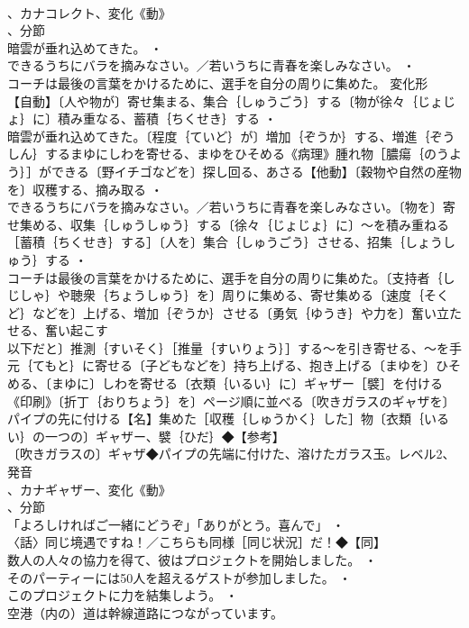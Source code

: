 \documentclass[8pt]{extreport}
\begin{document}
\begin{CJK}{UTF8}{min}
\\	、カナコレクト、変化《動》
\\	、分節
\\	暗雲が垂れ込めてきた。 ・
\\	できるうちにバラを摘みなさい。／若いうちに青春を楽しみなさい。 ・
\\	コーチは最後の言葉をかけるために、選手を自分の周りに集めた。	変化形 
\\	【自動】〔人や物が〕寄せ集まる、集合｛しゅうごう｝する〔物が徐々｛じょじょ｝に〕積み重なる、蓄積｛ちくせき｝する ・
\\	暗雲が垂れ込めてきた。〔程度｛ていど｝が〕増加｛ぞうか｝する、増進｛ぞうしん｝するまゆにしわを寄せる、まゆをひそめる《病理》腫れ物［膿瘍｛のうよう｝］ができる〔野イチゴなどを〕探し回る、あさる【他動】〔穀物や自然の産物を〕収穫する、摘み取る ・
\\	できるうちにバラを摘みなさい。／若いうちに青春を楽しみなさい。〔物を〕寄せ集める、収集｛しゅうしゅう｝する〔徐々｛じょじょ｝に〕～を積み重ねる［蓄積｛ちくせき｝する］〔人を〕集合｛しゅうごう｝させる、招集｛しょうしゅう｝する ・
\\	コーチは最後の言葉をかけるために、選手を自分の周りに集めた。〔支持者｛しじしゃ｝や聴衆｛ちょうしゅう｝を〕周りに集める、寄せ集める〔速度｛そくど｝などを〕上げる、増加｛ぞうか｝させる〔勇気｛ゆうき｝や力を〕奮い立たせる、奮い起こす
\\	以下だと〕推測｛すいそく｝［推量｛すいりょう｝］する～を引き寄せる、～を手元｛てもと｝に寄せる〔子どもなどを〕持ち上げる、抱き上げる〔まゆを〕ひそめる、〔まゆに〕しわを寄せる〔衣類｛いるい｝に〕ギャザー［襞］を付ける《印刷》〔折丁｛おりちょう｝を〕ページ順に並べる〔吹きガラスのギャザを〕パイプの先に付ける【名】集めた［収穫｛しゅうかく｝した］物〔衣類｛いるい｝の一つの〕ギャザー、襞｛ひだ｝◆【参考】
\\	〔吹きガラスの〕ギャザ◆パイプの先端に付けた、溶けたガラス玉。レベル2、発音
\\	、カナギャザー、変化《動》
\\	、分節
\\	「よろしければご一緒にどうぞ」「ありがとう。喜んで」 ・
\\	〈話〉同じ境遇ですね！／こちらも同様［同じ状況］だ！◆【同】
\\	数人の人々の協力を得て、彼はプロジェクトを開始しました。 ・
\\	そのパーティーには50人を超えるゲストが参加しました。 ・
\\	このプロジェクトに力を結集しよう。 ・
\\	空港（内の）道は幹線道路につながっています。

\end{CJK}
\end{document}
